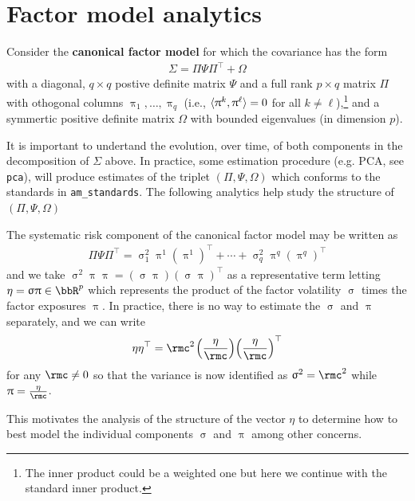 \documentclass[leqno,12pt]{article}
\begin{document}
{\begin{verbatim}
\end{verbatim}

\section{Factor model analytics}

Consider the {\bf canonical factor model} for which the covariance has the form
\begin{align}
 \Sigma = \Pi \Psi \Pi^\top +  \Omega
\end{align}
with a diagonal, $q \times q$ postive definite matrix $\Psi$ 
and a full rank $p \times q$ matrix $\Pi$ with othogonal 
columns $\uppi_1, \dots, \uppi_q$ (i.e., 
$\langle \uppi^k , \uppi^\ell \rangle = 0$ for all $k \neq
\ell$),\footnote{The inner product could be a weighted one
but here we continue with the standard inner product.}
and a symmertic positive definite matrix $\Omega$ with 
bounded eigenvalues (in dimension $p$).

It is important to undertand the evolution, over time, of 
both components in the decomposition of $\Sigma$ above.
In practice, some estimation procedure (e.g. PCA,
see \verb|pca|), will 
produce estimates of the triplet $(\Pi, \Psi, \Omega)$ which
conforms to the standards in \verb|am_standards|. The following
analytics help study the structure of $(\Pi, \Psi, \Omega)$

The systematic risk component of the canonical factor model
may be written as
\begin{align}
   \Pi \Psi \Pi^\top = 
  \upsigma_{1}^2 \uppi^1 (\uppi^1)^\top 
  + \cdots + \upsigma^2_{q} \uppi^q (\uppi^q)^\top 
\end{align}
and we take $\upsigma^2 \uppi \uppi
= (\upsigma \uppi)(\upsigma \uppi)^\top$ as a representative term
letting $\eta = \upsigma \uppi \in \bbR^p$ which represents the product
of the factor volatility $\upsigma$ times the factor exposures 
$\uppi$. In practice, there is no way to estimate the 
$\upsigma$ and $\uppi$ separately, and we can write
\begin{align}
  \eta \eta^\top = \rmc^2 \s \Big( \frac{\eta}{\rmc} \Big)
   \Big(\frac{\eta}{\rmc} \Big)^\top
\end{align}
for any $\rmc \neq 0$ so that the variance is now identified
as $\upsigma^2 = \rmc^2$ while $\uppi = \frac{\eta}{\rmc}$.



This motivates the analysis of the structure of the 
vector $\eta$ to determine how to best model the individual
components $\upsigma$ and $\uppi$ among other concerns.


}
\end{document}
